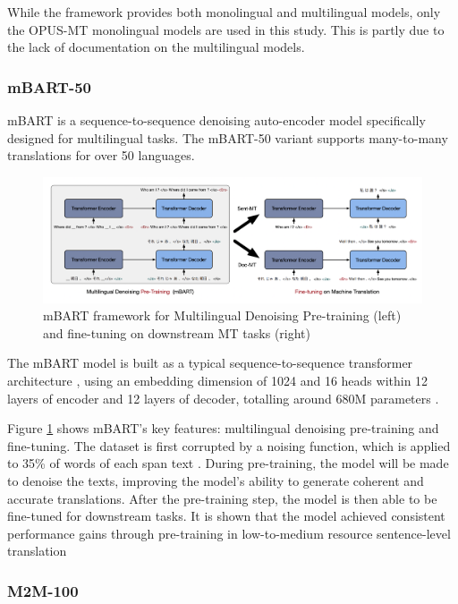 \documentclass[a4paper, 11pt]{article}
\begin{document}
While the framework provides both monolingual and multilingual models, only the OPUS-MT monolingual models are used in this study. This is partly due to the lack of documentation on the multilingual models.

\subsubsection{mBART-50}

mBART \cite{liu-2020-mbart} is a sequence-to-sequence denoising auto-encoder model specifically designed for multilingual tasks. The mBART-50 variant supports many-to-many translations for over 50 languages.

\begin{figure}[htbp]
    \centering
    \includegraphics[width=0.9\linewidth]{images/mbart.png}
    \caption{mBART framework for Multilingual Denoising Pre-training (left) and fine-tuning on downstream MT tasks
        (right) \cite{liu-2020-mbart}}
    \label{fig:mbart}
\end{figure}

The mBART model is built as a typical sequence-to-sequence transformer architecture \cite{vaswani-2017-attention}, using an embedding dimension of 1024 and 16 heads within 12 layers of encoder and 12 layers of decoder, totalling around 680M parameters \cite{liu-2020-mbart}.

Figure \ref{fig:mbart} shows mBART's key features: multilingual denoising pre-training and fine-tuning. The dataset is first corrupted by a noising function, which is applied to 35\% of words of each span text \cite{liu-2020-mbart}. During pre-training, the model will be made to denoise the texts, improving the model's ability to generate coherent and accurate translations. After the pre-training step, the model is then able to be fine-tuned for downstream tasks. It is shown that the model achieved consistent performance gains through pre-training in low-to-medium resource sentence-level translation \cite{liu-2020-mbart}

\subsubsection{M2M-100}
\end{document}
